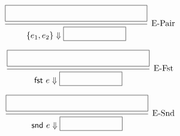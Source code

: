\documentclass[12pt, dvipsnames]{exam}
\begin{document}
\thispagestyle{empty}

\theoremstyle{definition}
\newtheorem{definition}{Definition}[section]

\renewcommand{\solutiontitle}{\noindent\textbf{Explanation:}\enspace}

\newcommand{\eval}[2]{#1 \Downarrow #2}

\[
    \begin{prooftree}
        \hypo{\fbox{\phantom{{\Large This is my first hypothesis}}}}
        \infer1[E-Pair]{\eval{\{e_1, e_2\}}{\fbox{\phantom{{\Large Final value}}}}}
    \end{prooftree}
\]
\begin{solutionorbox}
    \vspace*{4em}
\end{solutionorbox}

\vspace{3em}

\[
    \begin{prooftree}
        \hypo{\fbox{\phantom{{\Large This is my first hypothesis}}}}
        \infer1[E-Fst]{\eval{\textsf{fst}\ e}{\fbox{\phantom{{\Large Final value}}}}}
    \end{prooftree}
\]
\begin{solutionorbox}
    \vspace*{4em}
\end{solutionorbox}

\vspace{3em}

\[
    \begin{prooftree}
        \hypo{\fbox{\phantom{{\Large This is my first hypothesis}}}}
        \infer1[E-Snd]{\eval{\textsf{snd}\ e}{\fbox{\phantom{{\Large Final value}}}}}
    \end{prooftree}
\]
\begin{solutionorbox}
    \vspace*{4em}
\end{solutionorbox}
\end{document}
